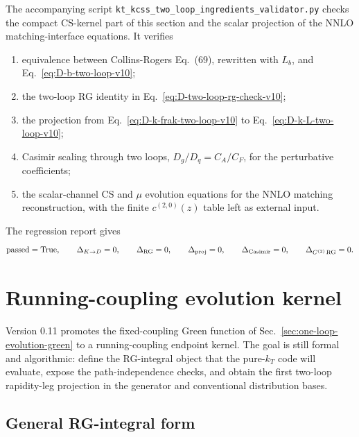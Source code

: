 \documentclass[11pt]{article}
\begin{document}
The accompanying script
\texttt{kt\_kcss\_two\_loop\_ingredients\_validator.py} checks the compact CS-kernel
part of this section and the scalar projection of the NNLO matching-interface equations.
It verifies
\begin{enumerate}
  \item equivalence between Collins-Rogers Eq.~(69), rewritten with $L_b$, and
  Eq.~\eqref{eq:D-b-two-loop-v10};
  \item the two-loop RG identity in Eq.~\eqref{eq:D-two-loop-rg-check-v10};
  \item the projection from Eq.~\eqref{eq:D-k-frak-two-loop-v10} to
  Eq.~\eqref{eq:D-k-L-two-loop-v10};
  \item Casimir scaling through two loops, $D_g/D_q=C_A/C_F$, for the perturbative
  coefficients;
  \item the scalar-channel CS and $\mu$ evolution equations for the NNLO matching
  reconstruction, with the finite $c^{(2,0)}(z)$ table left as external input.
\end{enumerate}
The regression report gives
\begin{equation}
  \mathrm{passed}=\mathrm{True},
  \qquad
  \Delta_{K\to D}=0,
  \qquad
  \Delta_{\rm RG}=0,
  \qquad
  \Delta_{\rm proj}=0,
  \qquad
  \Delta_{\rm Casimir}=0,
  \qquad
  \Delta_{C^{(2)}\,{\rm RG}}=0.
  \label{eq:two-loop-cs-validator-results}
\end{equation}


\section{Running-coupling evolution kernel}
\label{sec:running-coupling-evolution}

Version 0.11 promotes the fixed-coupling Green function of
Sec.~\ref{sec:one-loop-evolution-green} to a running-coupling endpoint kernel.  The goal
is still formal and algorithmic: define the RG-integral object that the pure-$k_T$ code
will evaluate, expose the path-independence checks, and obtain the first two-loop
rapidity-leg projection in the generator and conventional distribution bases.

\subsection{General RG-integral form}
\end{document}
